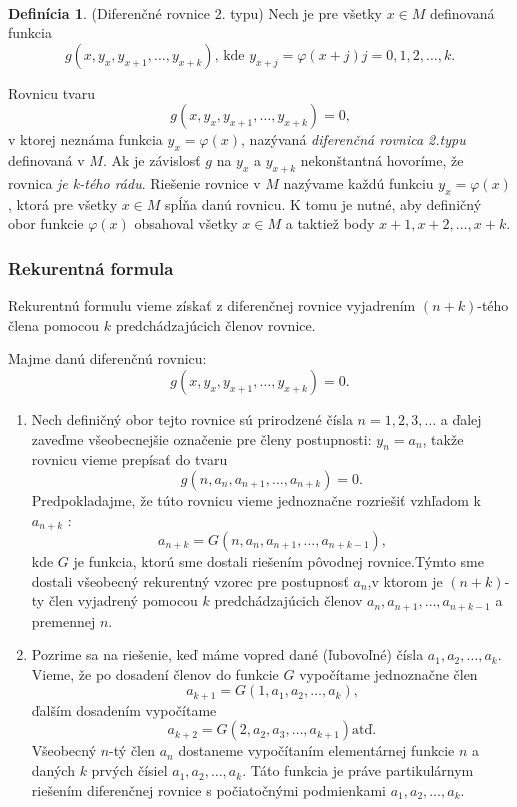 \documentclass[a4paper,10pt]{article}
\theoremstyle{plain}
\theoremstyle{definition}
\newtheorem{defin}[thm]{Definícia}
\begin{document}
\paragraph{}
\begin{defin}
(Diferenčné rovnice 2. typu)
Nech je pre všetky $x \in M$
definovaná funkcia
$$g(x, y_{x}, y_{x+1}, \ldots, y_{x+k})\text{, kde }y_{x+j} = \varphi(x + j) j = 0, 1, 2, \ldots, k\text{.}$$
\end{defin}

Rovnicu tvaru
$$g(x, y_{x}, y_{x+1}, \ldots, y_{x+k}) = 0\text{,}$$
v ktorej neznáma funkcia $y_{x} = \varphi(x)$, nazývaná \textit{diferenčná rovnica 2.typu}
definovaná v $M$. Ak je závislosť $g$ na $y_{x}$ a $y_{x+k}$ nekonštantná hovoríme,
že rovnica \textit{je k-tého rádu}. Riešenie rovnice v $M$ nazývame každú funkciu
$y_{x} = \varphi(x)$, ktorá pre všetky $x \in M$  spĺňa danú rovnicu. K tomu je nutné,
aby definičný obor funkcie $\varphi(x)$ obsahoval všetky $x \in M$ a taktiež body
$x + 1, x + 2, \ldots, x + k$.
\newpage
\subsubsection{Rekurentná formula}
Rekurentnú formulu vieme získať z diferenčnej rovnice vyjadrením $(n+k)$-tého člena pomocou $k$ predchádzajúcich členov rovnice.


\indent Majme danú diferenčnú rovnicu: $$g(x, y_{x}, y_{x+1}, \ldots, y_{x+k}) = 0\text{.}$$

\begin{enumerate}
	\item Nech definičný obor tejto rovnice sú prirodzené čísla $ n = 1, 2, 3, \ldots$ a
		ďalej zaveďme všeobecnejšie označenie pre členy postupnosti: $ y_{n} =  a_{n}$,
		takže rovnicu vieme prepísať do tvaru  $$g(n, a_{n}, a_{n+1}, \ldots, a_{n+k}) = 0\text{.}$$
		Predpokladajme, že túto rovnicu vieme jednoznačne rozriešiť vzhľadom k $ a_{n+k}$ :
		$$a_{n+k} = G(n, a_{n}, a_{n+1}, \ldots, a_{n+k-1})\text{,}$$
		kde $G$ je funkcia, ktorú sme dostali riešením pôvodnej rovnice.\linebreak[4]
		Týmto sme dostali všeobecný rekurentný vzorec pre postupnosť $a_{n}$,\linebreak[4] v ktorom je $(n+k)$-ty 				člen vyjadrený pomocou $k$ predchádzajúcich členov 
		$a_{n}, a_{n+1}, \ldots, a_{n+k-1}$ a premennej $n$.
	\item Pozrime sa na riešenie, keď máme vopred dané (ľubovoľné) čísla $ a_{1}, a_{2}, \ldots, a_{k}$.
		Vieme, že po dosadení členov do funkcie $G$ vypočítame jednoznačne člen
		$$a_{k+1} = G(1, a_{1}, a_{2}, \ldots, a_{k})\text{,}$$ ďalším dosadením vypočítame
		$$a_{k+2} = G(2, a_{2}, a_{3}, \ldots, a_{k+1})\text{atď.}$$
		Všeobecný $n$-tý člen $ a_{n} $ dostaneme vypočítaním elementárnej funkcie
		$n$ a daných $k$ prvých čísiel $ a_{1}, a_{2}, \ldots, a_{k}$. Táto funkcia je práve partikulárnym riešením 				diferenčnej rovnice s počiatočnými podmienkami $ a_{1}, a_{2}, \ldots, a_{k}$.	
\end{enumerate}
\end{document}
